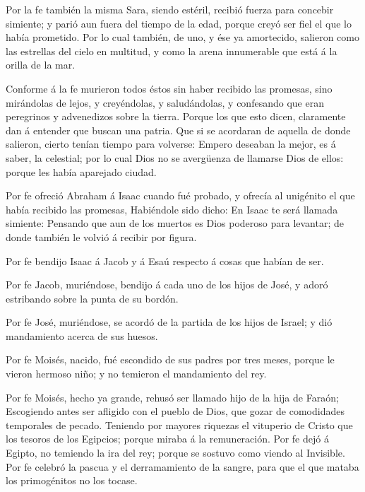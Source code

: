  Por la fe también la misma Sara, siendo estéril, recibió
fuerza para concebir simiente; y parió aun fuera del tiempo de la edad,
porque creyó ser fiel el que lo había prometido.  Por lo
cual también, de uno, y ése ya amortecido, salieron como las estrellas
del cielo en multitud, y como la arena innumerable que está á la orilla
de la mar.

 Conforme á la fe murieron todos éstos sin haber recibido
las promesas, sino mirándolas de lejos, y creyéndolas, y saludándolas, y
confesando que eran peregrinos y advenedizos sobre la tierra.
 Porque los que esto dicen, claramente dan á entender que
buscan una patria.  Que si se acordaran de aquella de donde
salieron, cierto tenían tiempo para volverse:  Empero
deseaban la mejor, es á saber, la celestial; por lo cual Dios no se
avergüenza de llamarse Dios de ellos: porque les había aparejado ciudad.

 Por fe ofreció Abraham á Isaac cuando fué probado, y
ofrecía al unigénito el que había recibido las promesas, 
Habiéndole sido dicho: En Isaac te será llamada simiente: 
Pensando que aun de los muertos es Dios poderoso para levantar; de donde
también le volvió á recibir por figura.

 Por fe bendijo Isaac á Jacob y á Esaú respecto á cosas que
habían de ser.

 Por fe Jacob, muriéndose, bendijo á cada uno de los hijos
de José, y adoró estribando sobre la punta de su bordón.

 Por fe José, muriéndose, se acordó de la partida de los
hijos de Israel; y dió mandamiento acerca de sus huesos.

 Por fe Moisés, nacido, fué escondido de sus padres por
tres meses, porque le vieron hermoso niño; y no temieron el mandamiento
del rey.

 Por fe Moisés, hecho ya grande, rehusó ser llamado hijo de
la hija de Faraón;  Escogiendo antes ser afligido con el
pueblo de Dios, que gozar de comodidades temporales de pecado.
 Teniendo por mayores riquezas el vituperio de Cristo que
los tesoros de los Egipcios; porque miraba á la remuneración.
 Por fe dejó á Egipto, no temiendo la ira del rey; porque
se sostuvo como viendo al Invisible.  Por fe celebró la
pascua y el derramamiento de la sangre, para que el que mataba los
primogénitos no los tocase.

